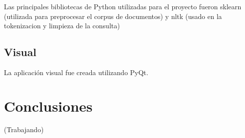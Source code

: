 \documentclass[runningheads]{llncs}
\begin{document}
Las principales bibliotecas de Python utilizadas para el proyecto fueron sklearn (utilizada para preprocesar el corpus de documentos) y nltk (usado en la tokenizacion y limpieza de la consulta)

\subsection*{Visual}
La aplicación visual fue creada utilizando PyQt.

\section*{Conclusiones}
(Trabajando)
\end{document}
